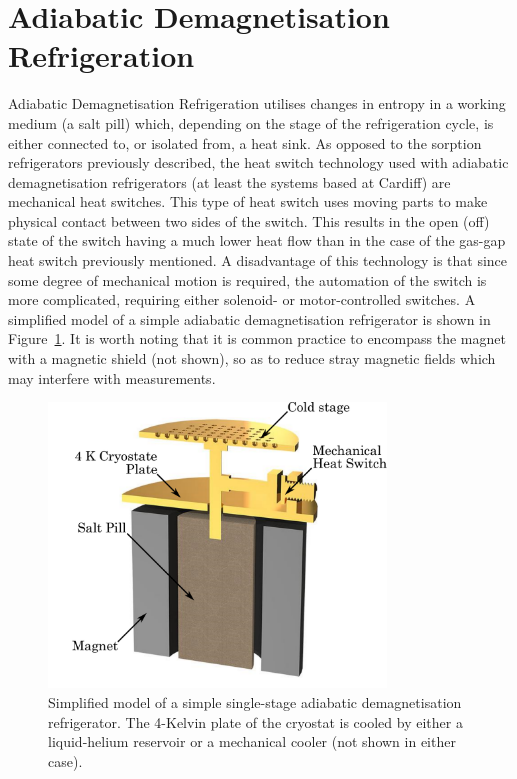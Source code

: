 \section{Adiabatic Demagnetisation Refrigeration}\label{sec:ADR}
Adiabatic Demagnetisation Refrigeration utilises changes in entropy in a working medium (a salt pill) which, depending on the stage of the refrigeration cycle, is either connected to, or isolated from, a heat sink. As opposed to the sorption refrigerators previously described, the heat switch technology used with adiabatic demagnetisation refrigerators (at least the systems based at Cardiff) are mechanical heat switches. This type of heat switch uses moving parts to make physical contact between two sides of the switch. This results in the open (off) state of the switch having a much lower heat flow than in the case of the gas-gap heat switch previously mentioned. A disadvantage of this technology is that since some degree of mechanical motion is required, the automation of the switch is more complicated, requiring either solenoid- or motor-controlled switches. A simplified model of a simple adiabatic demagnetisation refrigerator is shown in Figure~\ref{fig:ADR}. It is worth noting that it is common practice to encompass the magnet with a magnetic shield (not shown), so as to reduce stray magnetic fields which may interfere with measurements.
\begin{figure}[tb]
\begin{center}
\includegraphics[width = 0.8\textwidth]{figures/ADR}
\caption[Simplified model of a simple single-stage adiabatic demagnetisation refrigerator]{Simplified model of a simple single-stage adiabatic demagnetisation refrigerator. The 4-Kelvin plate of the cryostat is cooled by either a liquid-helium reservoir or a mechanical cooler (not shown in either case).}
\label{fig:ADR}
\end{center}
\end{figure}
